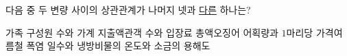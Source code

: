 다음 중 두 변량 사이의 상관관계가 나머지 넷과 \underline{다른} 하나는?
\begin{choicesv}{가족 구성원 수와 가계 지출액}{관객 수와 입장료 총액}{오징어 어획량과 $1$마리당 가격}{여름철 폭염 일수와 냉방비}{물의 온도와 소금의 용해도}\end{choicesv}
